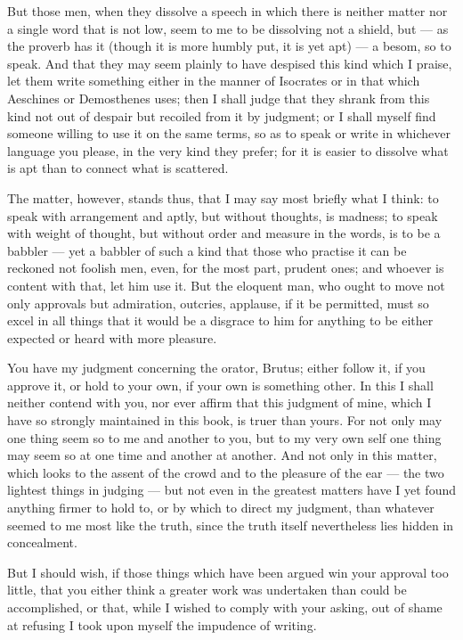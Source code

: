  But those men, when they dissolve a speech in which there is neither matter nor a single word that is not low, seem to me to be dissolving not a shield, but — as the proverb has it (though it is more humbly put, it is yet apt) — a besom, so to speak. And that they may seem plainly to have despised this kind which I praise, let them write something either in the manner of Isocrates or in that which Aeschines or Demosthenes uses; then I shall judge that they shrank from this kind not out of despair but recoiled from it by judgment; or I shall myself find someone willing to use it on the same terms, so as to speak or write in whichever language you please, in the very kind they prefer; for it is easier to dissolve what is apt than to connect what is scattered.

 The matter, however, stands thus, that I may say most briefly what I think: to speak with arrangement and aptly, but without thoughts, is madness; to speak with weight of thought, but without order and measure in the words, is to be a babbler — yet a babbler of such a kind that those who practise it can be reckoned not foolish men, even, for the most part, prudent ones; and whoever is content with that, let him use it. But the eloquent man, who ought to move not only approvals but admiration, outcries, applause, if it be permitted, must so excel in all things that it would be a disgrace to him for anything to be either expected or heard with more pleasure.

 You have my judgment concerning the orator, Brutus; either follow it, if you approve it, or hold to your own, if your own is something other. In this I shall neither contend with you, nor ever affirm that this judgment of mine, which I have so strongly maintained in this book, is truer than yours. For not only may one thing seem so to me and another to you, but to my very own self one thing may seem so at one time and another at another. And not only in this matter, which looks to the assent of the crowd and to the pleasure of the ear — the two lightest things in judging — but not even in the greatest matters have I yet found anything firmer to hold to, or by which to direct my judgment, than whatever seemed to me most like the truth, since the truth itself nevertheless lies hidden in concealment.

 But I should wish, if those things which have been argued win your approval too little, that you either think a greater work was undertaken than could be accomplished, or that, while I wished to comply with your asking, out of shame at refusing I took upon myself the impudence of writing.
